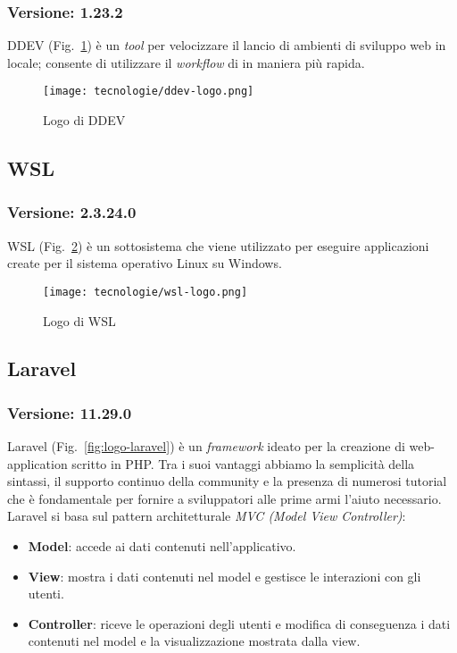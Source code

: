 \subsubsection{Versione: 1.23.2}
DDEV (Fig.~\ref{fig:logo-ddev}) è un \emph{tool} per velocizzare il lancio di ambienti di sviluppo web in locale; consente di utilizzare il \emph{\gls{workflow}} di  in maniera più rapida.

\begin{figure}[!h] 
  \centering 
  \texttt{[image: tecnologie/ddev-logo.png]} 
  \caption{Logo di DDEV}
  \label{fig:logo-ddev}
\end{figure}

\newpage

\subsection{\label{tec:wsl}WSL}
\subsubsection{Versione: 2.3.24.0}
WSL (Fig.~\ref{fig:logo-wsl}) è un sottosistema che viene utilizzato per eseguire applicazioni create per il sistema operativo Linux su Windows.

\begin{figure}[!h] 
  \centering 
  \texttt{[image: tecnologie/wsl-logo.png]} 
  \caption{Logo di WSL}
  \label{fig:logo-wsl}
\end{figure}

\subsection{\label{tec:Laravel}Laravel}
\subsubsection{Versione: 11.29.0}
Laravel (Fig.~\ref{fig:logo-laravel}) è un \emph{\gls{framework}} ideato per la creazione di web-application scritto in PHP.
Tra i suoi vantaggi abbiamo la semplicità della sintassi, il supporto continuo della community e la presenza di numerosi tutorial che è fondamentale per fornire a sviluppatori alle prime armi l'aiuto necessario.
Laravel si basa sul pattern architetturale \emph{MVC (Model View Controller)}:
\begin{itemize}
  \item \textbf{Model}: accede ai dati contenuti nell'applicativo.
  \item \textbf{View}: mostra i dati contenuti nel model e gestisce le interazioni con gli utenti.  
  \item \textbf{Controller}: riceve le operazioni degli utenti e modifica di conseguenza i dati contenuti nel model e la visualizzazione mostrata dalla view.
\end{itemize}

